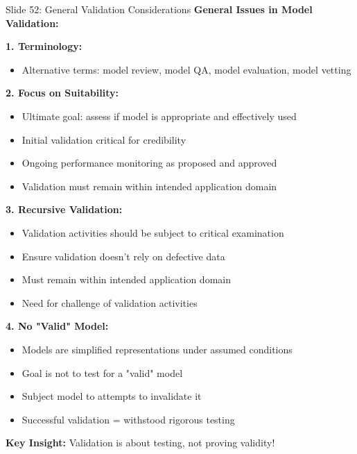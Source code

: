 \documentclass[8pt]{beamer}
\begin{document}
	\begin{frame}{Slide 52: General Validation Considerations}
		\fontsize{6.5}{7.5}\selectfont
		\textbf{General Issues in Model Validation:}
		
		\vspace{0.1cm}
		\textbf{1. Terminology:}
		\begin{itemize}
			\item Alternative terms: model review, model QA, model evaluation, model vetting
		\end{itemize}
		
		\vspace{0.1cm}
		\textbf{2. Focus on Suitability:}
		\begin{itemize}
			\item Ultimate goal: assess if model is appropriate and effectively used
			\item Initial validation critical for credibility
			\item Ongoing performance monitoring as proposed and approved
			\item Validation must remain within intended application domain
		\end{itemize}
		
		\vspace{0.1cm}
		\textbf{3. Recursive Validation:}
		\begin{itemize}
			\item Validation activities should be subject to critical examination
			\item Ensure validation doesn't rely on defective data
			\item Must remain within intended application domain
			\item Need for challenge of validation activities
		\end{itemize}
		
		\vspace{0.1cm}
		\textbf{4. No "Valid" Model:}
		\begin{itemize}
			\item Models are simplified representations under assumed conditions
			\item Goal is not to test for a "valid" model
			\item Subject model to attempts to invalidate it
			\item Successful validation = withstood rigorous testing
		\end{itemize}
		
		\textcolor{myblue}{\textbf{Key Insight:}} Validation is about \textcolor{myblue}{testing, not proving validity}!
	\end{frame}
	
\end{document}
